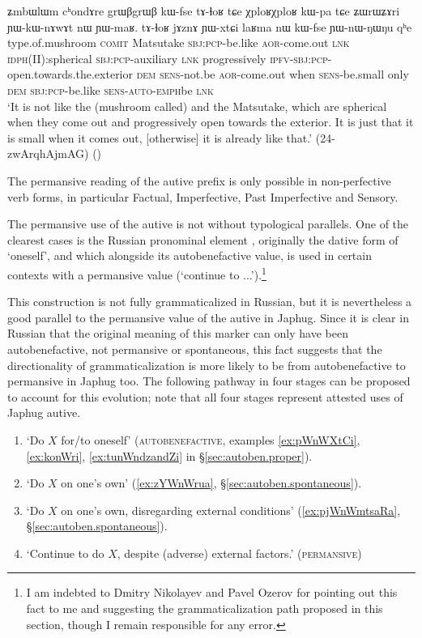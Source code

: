 \begin{exe}
 \ex \label{ex:YWnWNWNu}
 \gll ʑmbɯlɯm cʰondɤre grɯβgrɯβ kɯ-fse tɤ-ɬoʁ tɕe χploʁχploʁ kɯ-pa tɕe ʑɯrɯʑɤri ɲɯ-kɯ-nɤwɤt nɯ ɲɯ-maʁ. tɤ-ɬoʁ jɤznɤ ɲɯ-xtɕi laʁma nɯ kɯ-fse ɲɯ-nɯ-ŋɯ\redp{}ŋu qʰe\\
type.of.mushroom \textsc{comit} Matsutake \textsc{sbj}:\textsc{pcp}-be.like \textsc{aor}-come.out \textsc{lnk} \textsc{idph(II):}spherical \textsc{sbj}:\textsc{pcp}-auxiliary \textsc{lnk} progressively \textsc{ipfv}-\textsc{sbj}:\textsc{pcp}-open.towards.the.exterior \textsc{dem} \textsc{sens}-not.be  \textsc{aor}-come.out when \textsc{sens}-be.small only \textsc{dem} \textsc{sbj}:\textsc{pcp}-be.like \textsc{sens}-\textsc{auto}-\textsc{emph}\redp{}be \textsc{lnk}\\
\glt `It is not like the (mushroom called)  and the Matsutake, which are spherical when they come out and progressively open towards the exterior. It is just that it is small when it comes out, [otherwise] it is already like that.'  (24-zwArqhAjmAG)
()
 \end{exe}
 
The permansive reading of the autive prefix is only possible in non-perfective verb forms, in particular Factual, Imperfective, Past Imperfective and Sensory.

The permansive use of the autive  is not without typological parallels. One of the clearest cases is the Russian pronominal element , originally the dative form of  `oneself', and which alongside its autobenefactive value,  is used in certain contexts with a permansive value (`continue to ...').\footnote{I am indebted to Dmitry Nikolayev and Pavel Ozerov for pointing out this fact to me and suggesting the grammaticalization path proposed in this section, though I remain responsible for any error.}
 
This construction is not fully grammaticalized in Russian, but it is nevertheless a good parallel to the permansive value of the autive in Japhug. Since it is clear in Russian that the original meaning of this marker can only have been autobenefactive, not permansive or spontaneous, this fact suggests that the directionality of grammaticalization is more likely to be from autobenefactive to permansive in Japhug too. The following pathway in four stages can be proposed to account for this evolution; note that all four stages represent attested uses of Japhug autive.

\begin{enumerate}
\item `Do $X$ for/to oneself' (\textsc{autobenefactive}, examples \ref{ex:pWnWXtCi}, \ref{ex:konWri}, \ref{ex:tunWndzandZi} in §\ref{sec:autoben.proper}).  
\item `Do $X$ on one's own' (\ref{ex:zYWnWrua}, §\ref{sec:autoben.spontaneous}).
\item `Do $X$ on one's own, disregarding external conditions' (\ref{ex:pjWnWmtsaRa}, §\ref{sec:autoben.spontaneous}).
\item `Continue to do $X$, despite (adverse) external factors.' (\textsc{permansive})
\end{enumerate}
 
